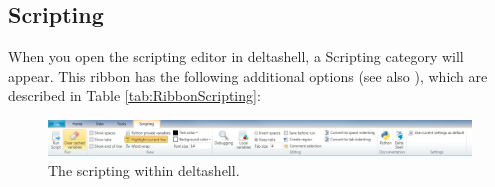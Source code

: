 
\subsection{Scripting}\label{ssec:scriptingeditorribbon}

When you open the scripting editor in deltashell, a Scripting  category will appear. This ribbon has the following additional options (see also ), which are described in Table \ref{tab:RibbonScripting}:
%
\begin{figure}[H]
\centering
\includegraphics[width=\textwidth]{Figures/Ribbon.png}
\caption{The scripting  within deltashell.}
\label{Fig:RibbonScripting}
\end{figure}

